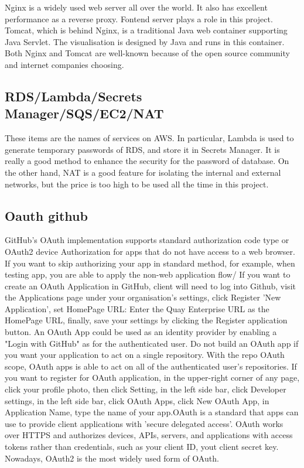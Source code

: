 \documentclass[conference]{IEEEtran}
\begin{document}
Nginx is a widely used web server all over the world. It also has excellent performance as a reverse proxy. 
Fontend server plays a role in this project. Tomcat, which is behind Nginx, is a traditional Java web container supporting 
Java Servlet. The visualisation is designed by Java and runs in this container. Both Nginx and Tomcat are well-known because of 
the open source community and internet companies choosing.

\subsection{RDS/Lambda/Secrets Manager/SQS/EC2/NAT}

These items are the names of services on AWS. In particular, Lambda is used to generate temporary passwords of RDS, and store it in 
Secrets Manager. It is really a good method to enhance the security for the password of database. On the other hand, NAT is a 
good feature for isolating the internal and external networks, but the price is too high to be used all the time in this project.

\subsection{Oauth github}

GitHub's OAuth implementation supports standard authorization code type or OAuth2 device Authorization
for apps that do not have access to a web browser. If you want to skip authorizing your app in
standard method, for example, when testing app, you are able to apply the non-web application flow/
If you want to create an OAuth Application in GitHub, client will need to log into Github, visit
the Applications page under your organisation's settings, click Register 'New Application',
set HomePage URL: Enter the Quay Enterprise URL as the HomePage URL, finally, save your settings by
clicking the Register application button. An OAuth App could be used as an identity provider by enabling
a "Login with GitHub" as for the authenticated user. Do not build an OAuth app if you want your
application to act on a single repository. With the repo OAuth scope, OAuth apps is able to act on
all of the authenticated user's repositories. If you want to register for OAuth application,
in the upper-right corner of any page, click your profile photo, then click Setting, in the
left side bar, click Developer settings, in the left side bar, click OAuth Apps, click New
OAuth App, in Application Name, type the name of your app.OAuth is a standard that apps can
use to provide client applications with 'secure delegated access'. OAuth works over HTTPS and
authorizes devices, APIs, servers, and applications with access tokens rather than credentials,
such as your client ID, yout client secret key. Nowadays, OAuth2 is the most widely used form of
OAuth.
\end{document}
